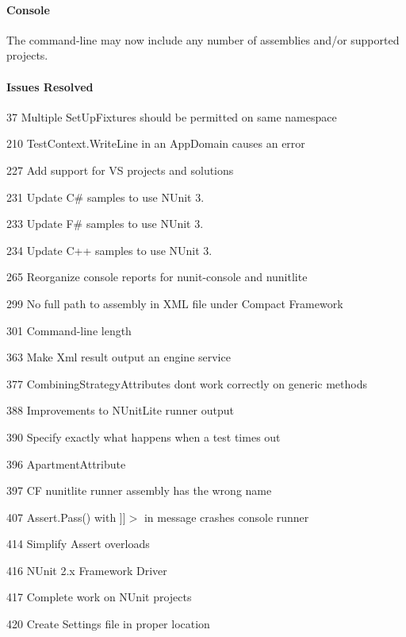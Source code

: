 \paragraph*{Console}


\begin{DoxyItemize}
\item The command-\/line may now include any number of assemblies and/or supported projects.
\end{DoxyItemize}

\paragraph*{Issues Resolved}


\begin{DoxyItemize}
\item 37 Multiple Set\+Up\+Fixtures should be permitted on same namespace
\item 210 Test\+Context.\+Write\+Line in an App\+Domain causes an error
\item 227 Add support for VS projects and solutions
\item 231 Update C\# samples to use N\+Unit 3.
\item 233 Update F\# samples to use N\+Unit 3.
\item 234 Update C++ samples to use N\+Unit 3.
\item 265 Reorganize console reports for nunit-\/console and nunitlite
\item 299 No full path to assembly in X\+ML file under Compact Framework
\item 301 Command-\/line length
\item 363 Make Xml result output an engine service
\item 377 Combining\+Strategy\+Attributes don\textquotesingle{}t work correctly on generic methods
\item 388 Improvements to N\+Unit\+Lite runner output
\item 390 Specify exactly what happens when a test times out
\item 396 Apartment\+Attribute
\item 397 CF nunitlite runner assembly has the wrong name
\item 407 Assert.\+Pass() with ]]$>$ in message crashes console runner
\item 414 Simplify Assert overloads
\item 416 N\+Unit 2.\+x Framework Driver
\item 417 Complete work on N\+Unit projects
\item 420 Create Settings file in proper location
\end{DoxyItemize}

